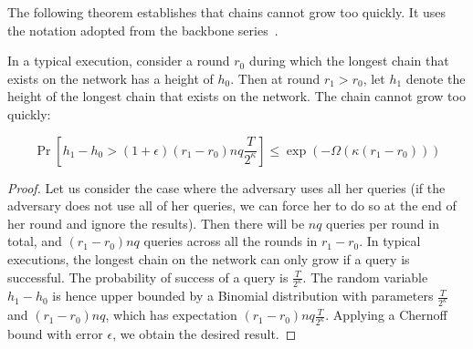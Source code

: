 The following theorem establishes that chains cannot grow too quickly. It uses the
notation adopted from the backbone series~\cite{backbone,varbackbone}.

\begin{theorem*}
  In a typical execution,
consider a round $r_0$ during which the longest chain that exists on the network has
a height of $h_0$. Then at round $r_1 > r_0$, let $h_1$ denote the height of the longest
chain that exists on the network. The chain cannot grow too quickly:

\[
  \Pr[h_1 - h_0 > (1 + \epsilon) (r_1 - r_0)nq \frac{T}{2^\kappa}] \leq \exp(-\Omega(\kappa (r_1 - r_0)))
\]
\end{theorem*}
\begin{proof}
  Let us consider the case where the adversary uses all her queries (if the adversary does not use
  all of her queries, we can force her to do so at the end of her round and ignore the results).
  Then there will be $nq$ queries per round in total, and $(r_1 - r_0)nq$ queries across all the rounds
  in $r_1 - r_0$. In typical executions, the longest chain on the network can only grow if a query is successful.
  The probability of success of a query is $\frac{T}{2^\kappa}$. The random variable $h_1 - h_0$ is
  hence upper bounded by a Binomial distribution with parameters $\frac{T}{2^\kappa}$ and $(r_1 - r_0)nq$,
  which has expectation $(r_1 - r_0)nq \frac{T}{2^\kappa}$. Applying a Chernoff bound with error $\epsilon$,
  we obtain the desired result.
\end{proof}
